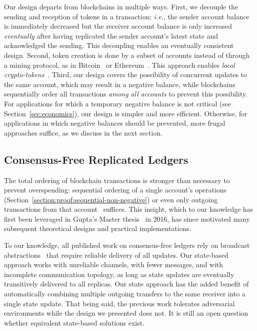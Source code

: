 \documentclass[9pt, oneside]{article}   	%
\begin{document}
Our design departs from blockchains in multiple ways. First, we decouple the sending and reception of tokens in a transaction: \textit{i.e.}, the sender account balance is immediately decreased but the receiver account balance is only increased \textit{eventually} after having replicated the sender account's latest state and acknowledged the sending. This decoupling enables an eventually consistent design. Second, token creation is done by a subset of accounts instead of through a mining protocol, as in Bitcoin~\cite{nakamoto2008bitcoin} or Ethereum~\cite{buterin2014next}. This approach enables \textit{local crypto-tokens}~\cite{lavoie2022localcryptotokens}. Third, our design covers the possibility of concurrent updates to the same account, which may result in a negative balance, while blockchains sequentially order all transactions \textit{among all accounts} to prevent this possibility. For applications for which a temporary negative balance is not critical (see Section~\ref{sec:economics}), our design is simpler and more efficient. Otherwise, for applications in which negative balances should be prevented, more frugal approaches suffice, as we discuss in the next section. 

\subsection{Consensus-Free Replicated Ledgers}
\label{sec:consensus-free-ledgers}

The total ordering of blockchain transactions is stronger than necessary to prevent overspending: sequential ordering of a single account's operations (Section~\ref{section:proof:sequential-non-negative}) or even only outgoing transactions from that account~\cite{guerraoui2021consensus} suffices. This insight, which to our knowledge has first been leveraged in Gupta's Master thesis~\cite{gupta2016nonconsensusdft} in 2016, has since motivated many subsequent theoretical designs and practical implementations. 

To our knowledge, all published work on consensus-free ledgers rely on broadcast abstractions~\cite{collins2020broadcast-payment,baudet2020fastpay,sliwinski2020abc,guerraoui2021consensus,auvolat2021money,frey:hal-03346756,kuznetsov2021permissionless,cholvi2021bdso,georghiades2021needs} that require reliable delivery of all updates. Our state-based approach works with unreliable channels, with fewer messages, and with incomplete communication topology, as long as state updates are eventually transitively delivered to all replicas. Our state approach has the added benefit of automatically combining multiple outgoing transfers to the same receiver into a single state update. That being said, the previous work tolerates adversarial environments while the design we presented does not. It is still an open question whether equivalent state-based solutions exist.
\end{document}
